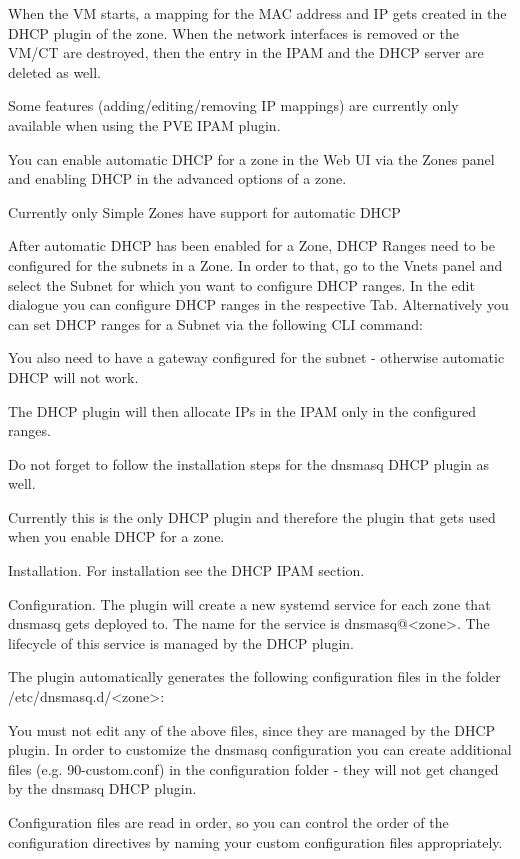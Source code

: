 When the VM starts, a mapping for the MAC address and IP gets created in the DHCP plugin of the zone. When the network interfaces is removed or the VM/CT are destroyed, then the entry in the IPAM and the DHCP server are deleted as well.

Some features (adding/editing/removing IP mappings) are currently only available when using the PVE IPAM plugin.

You can enable automatic DHCP for a zone in the Web UI via the Zones panel and enabling DHCP in the advanced options of a zone.

Currently only Simple Zones have support for automatic DHCP

After automatic DHCP has been enabled for a Zone, DHCP Ranges need to be configured for the subnets in a Zone. In order to that, go to the Vnets panel and select the Subnet for which you want to configure DHCP ranges. In the edit dialogue you can configure DHCP ranges in the respective Tab. Alternatively you can set DHCP ranges for a Subnet via the following CLI command:

You also need to have a gateway configured for the subnet - otherwise automatic DHCP will not work.

The DHCP plugin will then allocate IPs in the IPAM only in the configured ranges.

Do not forget to follow the installation steps for the dnsmasq DHCP plugin as well.

Currently this is the only DHCP plugin and therefore the plugin that gets used when you enable DHCP for a zone.

Installation. For installation see the DHCP IPAM section.

Configuration. The plugin will create a new systemd service for each zone that dnsmasq gets deployed to. The name for the service is dnsmasq@<zone>. The lifecycle of this service is managed by the DHCP plugin.

The plugin automatically generates the following configuration files in the folder /etc/dnsmasq.d/<zone>:

You must not edit any of the above files, since they are managed by the DHCP plugin. In order to customize the dnsmasq configuration you can create additional files (e.g. 90-custom.conf) in the configuration folder - they will not get changed by the dnsmasq DHCP plugin.

Configuration files are read in order, so you can control the order of the configuration directives by naming your custom configuration files appropriately.

